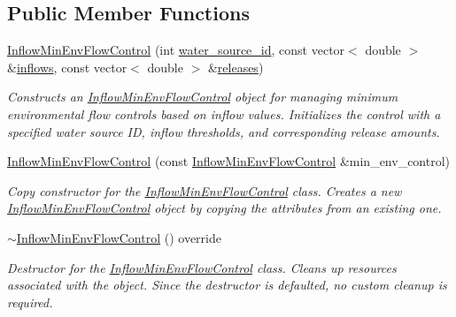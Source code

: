 \subsection*{Public Member Functions}
\begin{DoxyCompactItemize}
\item 
\mbox{\hyperlink{classInflowMinEnvFlowControl_aff6c04aaa6e206b29b072aea6fb38367}{Inflow\+Min\+Env\+Flow\+Control}} (int \mbox{\hyperlink{classMinEnvFlowControl_aada518a047598f386daec1d0358023aa}{water\+\_\+source\+\_\+id}}, const vector$<$ double $>$ \&\mbox{\hyperlink{classInflowMinEnvFlowControl_a669660259afa9313c77094dec815a52f}{inflows}}, const vector$<$ double $>$ \&\mbox{\hyperlink{classInflowMinEnvFlowControl_a2f82b53516516be63eb169d377df1f55}{releases}})
\begin{DoxyCompactList}\small\item\em Constructs an {\ttfamily \mbox{\hyperlink{classInflowMinEnvFlowControl}{Inflow\+Min\+Env\+Flow\+Control}}} object for managing minimum environmental flow controls based on inflow values. Initializes the control with a specified water source ID, inflow thresholds, and corresponding release amounts. \end{DoxyCompactList}\item 
\mbox{\hyperlink{classInflowMinEnvFlowControl_a6736e6aa07a27e314789e07a9ab30cad}{Inflow\+Min\+Env\+Flow\+Control}} (const \mbox{\hyperlink{classInflowMinEnvFlowControl}{Inflow\+Min\+Env\+Flow\+Control}} \&min\+\_\+env\+\_\+control)
\begin{DoxyCompactList}\small\item\em Copy constructor for the {\ttfamily \mbox{\hyperlink{classInflowMinEnvFlowControl}{Inflow\+Min\+Env\+Flow\+Control}}} class. Creates a new {\ttfamily \mbox{\hyperlink{classInflowMinEnvFlowControl}{Inflow\+Min\+Env\+Flow\+Control}}} object by copying the attributes from an existing one. \end{DoxyCompactList}\item 
\mbox{\hyperlink{classInflowMinEnvFlowControl_af96a86078cd257309ed55f0cd9ed032e}{$\sim$\+Inflow\+Min\+Env\+Flow\+Control}} () override
\begin{DoxyCompactList}\small\item\em Destructor for the {\ttfamily \mbox{\hyperlink{classInflowMinEnvFlowControl}{Inflow\+Min\+Env\+Flow\+Control}}} class. Cleans up resources associated with the object. Since the destructor is defaulted, no custom cleanup is required. \end{DoxyCompactList}\end{DoxyCompactItemize}
